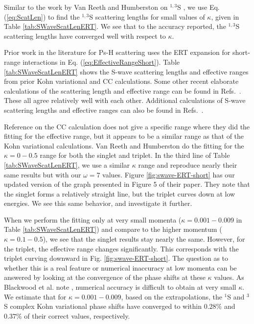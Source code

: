 \documentclass[reprint,showpacs,preprintnumbers,amsmath,amssymb,pra,aps]{revtex4-1}
\begin{document}
Similar to the work by Van Reeth and Humberston on $^{1,3}$S \cite{VanReeth2003}, we use Eq. (\ref{eq:ScatLen}) to find the $^{1,3}$S scattering lengths for small values of $\kappa$, given in Table \ref{tab:SWaveScatLenERT}. We see that to the accuracy reported, the $^{1,3}$S scattering lengths have converged well with respect to $\kappa$.

Prior work in the literature for Ps-H scattering \cite{Blackwood2002,Ivanov2002,Walters2004,VanReeth2003} uses the ERT expansion for short-range interactions in Eq. (\ref{eq:EffectiveRangeShort}). Table \ref{tab:SWaveScatLenERT} shows the S-wave scattering lengths and effective ranges from prior Kohn variational \cite{VanReeth2003} and CC \cite{Blackwood2002,Walters2004} calculations. Some other recent elaborate calculations of the scattering length and effective range can be found in Refs.~\cite{Sinha2000,Ivanov2001,Chiesa2002,Ivanov2002}. These all agree relatively well with each other. Additional calculations of S-wave scattering lengths and effective ranges can also be found in Refs.~\cite{Hara1975,Page1976,Drachman1975,Drachman1976,Campbell1998,Adhikari1999,Adhikari2001b}.

Reference \cite{Blackwood2002} on the CC calculation does not give a specific range where they did the fitting for the effective range, but it appears to be a similar range as that of the Kohn variational calculations. Van Reeth and Humberston \cite{VanReeth2003} do the fitting for the $\kappa = 0-0.5$ range for both the singlet and triplet. In the third line of Table \ref{tab:SWaveScatLenERT}, we use a similar $\kappa$ range and reproduce nearly their same results but with our $\omega = 7$ values. Figure \ref{fig:swave-ERT-short} has our updated version of the graph presented in Figure 5 of their paper. They note that the singlet forms a relatively straight line, but the triplet curves down at low energies. We see this same behavior, and investigate it further.

When we perform the fitting only at very small momenta ($\kappa = 0.001 - 0.009$ in Table \ref{tab:SWaveScatLenERT}) and compare to the higher momentum ($\kappa = 0.1 - 0.5$), we see that the singlet results stay nearly the same. However, for the triplet, the effective range changes significantly. This corresponds with the triplet curving downward in Fig. \ref{fig:swave-ERT-short}. The question as to whether this is a real feature or numerical inaccuracy at low momenta can be answered by looking at the convergence of the phase shifts at these $\kappa$ values. As Blackwood et al. note \cite{Blackwood2002}, numerical accuracy is difficult to obtain at very small $\kappa$. We estimate that for $\kappa = 0.001 - 0.009$, based on the extrapolations, the $^1$S and $^3$S complex Kohn variational phase shifts have converged to within $0.28\%$ and $0.37\%$ of their correct values, respectively.
\end{document}
